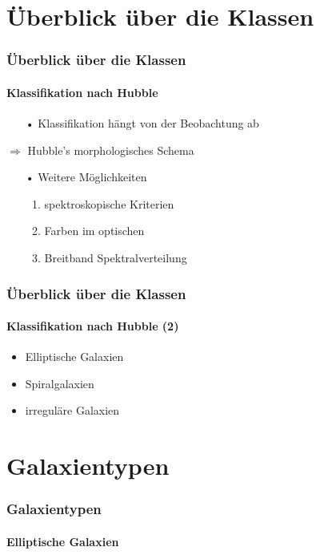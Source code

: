








\begin{frame}
\titlepage
\end{frame}



\begin{frame}
\tableofcontents
\end{frame}


\section{Überblick über die Klassen}

\begin{frame}
\frametitle{Überblick über die Klassen}
\framesubtitle{Klassifikation nach Hubble}

\begin{itemize}
\item[•] Klassifikation hängt von der Beobachtung ab
\end{itemize}
\qquad $\Rightarrow$ Hubble's morphologisches Schema



\begin{itemize}
\item[•] Weitere Möglichkeiten
\begin{enumerate}
\item spektroskopische Kriterien
\item Farben im optischen
\item Breitband Spektralverteilung
\end{enumerate}
\end{itemize}

\end{frame}


\begin{frame}
\frametitle{Überblick über die Klassen}
\framesubtitle{Klassifikation nach Hubble (2)}

\begin{itemize}
\item Elliptische Galaxien
\item Spiralgalaxien
\item irreguläre Galaxien
\end{itemize}

\end{frame}


\section{Galaxientypen}

\begin{frame}
\frametitle{Galaxientypen}
\framesubtitle{Elliptische Galaxien}

\end{frame}





